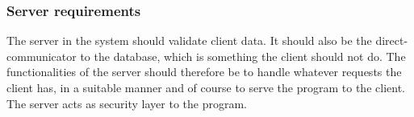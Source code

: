 \subsubsection{Server requirements}


The server in the system should validate client data. It should also be the
direct-communicator to the database, which is something the client should not do. The
functionalities of the server should therefore be to handle whatever requests the client
has, in a suitable manner and of course to serve the program to the client. The server acts
as security layer to the program.